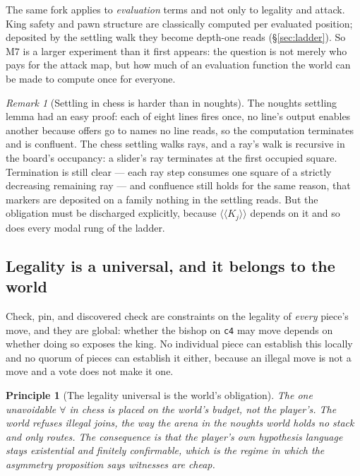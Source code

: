 \documentclass[11pt,a4paper]{article}
\theoremstyle{plain}
\newtheorem{principle}[theorem]{Principle}
\theoremstyle{definition}
\theoremstyle{remark}
\newtheorem{remark}[theorem]{Remark}
\newcommand{\KKmod}[1]{\langle\!\langle K_{#1}\rangle\!\rangle}
\begin{document}
The same fork applies to \emph{evaluation} terms and not only to legality and
attack. King safety and pawn structure are classically computed per evaluated
position; deposited by the settling walk they become depth-one reads
(\S\ref{sec:ladder}). So M7 is a larger experiment than it first appears: the
question is not merely who pays for the attack map, but how much of an
evaluation function the world can be made to compute once for everyone.

\begin{remark}[Settling in chess is harder than in noughts]
\label{rem:settle}
The noughts settling lemma had an easy proof: each of eight lines fires once, no
line's output enables another because offers go to names no line reads, so the
computation terminates and is confluent. The chess settling walks rays, and a
ray's walk is recursive in the board's occupancy: a slider's ray terminates at
the first occupied square. Termination is still clear --- each ray step consumes
one square of a strictly decreasing remaining ray --- and confluence still holds
for the same reason, that markers are deposited on a family nothing in the
settling reads. But the obligation must be discharged explicitly, because
$\KKmod{j}$ depends on it and so does every modal rung of the ladder.
\end{remark}

\subsection{Legality is a universal, and it belongs to the world}
\label{sec:legality}

Check, pin, and discovered check are constraints on the legality of \emph{every}
piece's move, and they are global: whether the bishop on \texttt{c4} may move
depends on whether doing so exposes the king. No individual piece can establish
this locally and no quorum of pieces can establish it either, because an illegal
move is not a move and a vote does not make it one.

\begin{principle}[The legality universal is the world's obligation]
\label{prin:legality}
The one unavoidable $\forall$ in chess is placed on the world's budget, not the
player's. The world refuses illegal joins, the way the arena in the noughts
world holds no stack and only routes. The consequence is that the player's own
hypothesis language stays existential and finitely confirmable, which is the
regime in which the asymmetry proposition says witnesses are cheap.
\end{principle}
\end{document}
